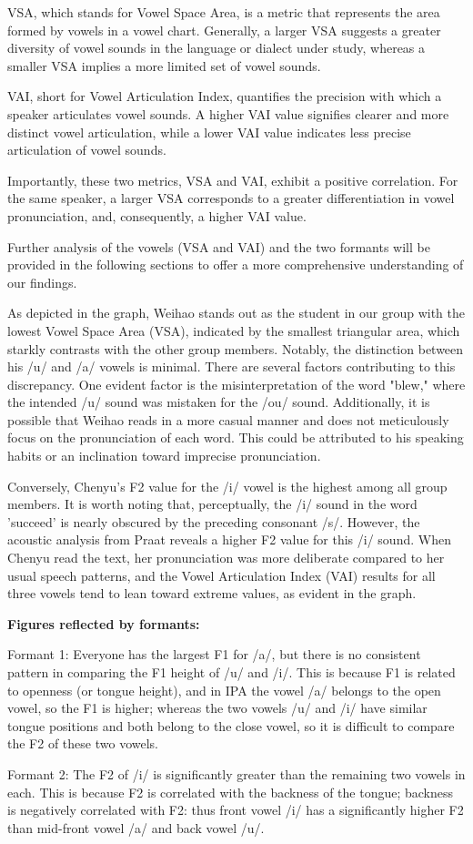 \documentclass{../labbook}
\begin{document}
\begin{solution}
VSA, which stands for Vowel Space Area, is a metric that represents the area formed by vowels in a vowel chart. Generally, a larger VSA suggests a greater diversity of vowel sounds in the language or dialect under study, whereas a smaller VSA implies a more limited set of vowel sounds.

VAI, short for Vowel Articulation Index, quantifies the precision with which a speaker articulates vowel sounds. A higher VAI value signifies clearer and more distinct vowel articulation, while a lower VAI value indicates less precise articulation of vowel sounds. 

Importantly, these two metrics, VSA and VAI, exhibit a positive correlation. For the same speaker, a larger VSA corresponds to a greater differentiation in vowel pronunciation, and, consequently, a higher VAI value.

Further analysis of the vowels (VSA and VAI) and the two formants will be provided in the following sections to offer a more comprehensive understanding of our findings.

As depicted in the graph, Weihao stands out as the student in our group with the lowest Vowel Space Area (VSA), indicated by the smallest triangular area, which starkly contrasts with the other group members. Notably, the distinction between his /u/ and /a/ vowels is minimal. There are several factors contributing to this discrepancy. One evident factor is the misinterpretation of the word "blew," where the intended /u/ sound was mistaken for the /ou/ sound. Additionally, it is possible that Weihao reads in a more casual manner and does not meticulously focus on the pronunciation of each word. This could be attributed to his speaking habits or an inclination toward imprecise pronunciation.

Conversely, Chenyu's F2 value for the /i/ vowel is the highest among all group members. It is worth noting that, perceptually, the /i/ sound in the word 'succeed' is nearly obscured by the preceding consonant /s/. However, the acoustic analysis from Praat reveals a higher F2 value for this /i/ sound. When Chenyu read the text, her pronunciation was more deliberate compared to her usual speech patterns, and the Vowel Articulation Index (VAI) results for all three vowels tend to lean toward extreme values, as evident in the graph.

\textbf{Figures reflected by formants:}

Formant 1: Everyone has the largest F1 for /a/, but there is no consistent pattern in comparing the F1 height of /u/ and /i/. This is because F1 is related to openness (or tongue height), and in IPA the vowel /a/ belongs to the open vowel, so the F1 is higher; whereas the two vowels /u/ and /i/ have similar tongue positions and both belong to the close vowel, so it is difficult to compare the F2 of these two vowels.

Formant 2:
The F2 of /i/ is significantly greater than the remaining two vowels in each. This is because F2 is correlated with the backness of the tongue; backness is negatively correlated with F2: thus front vowel /i/ has a significantly higher F2 than mid-front vowel /a/ and back vowel /u/.

\end{solution}
\end{document}
